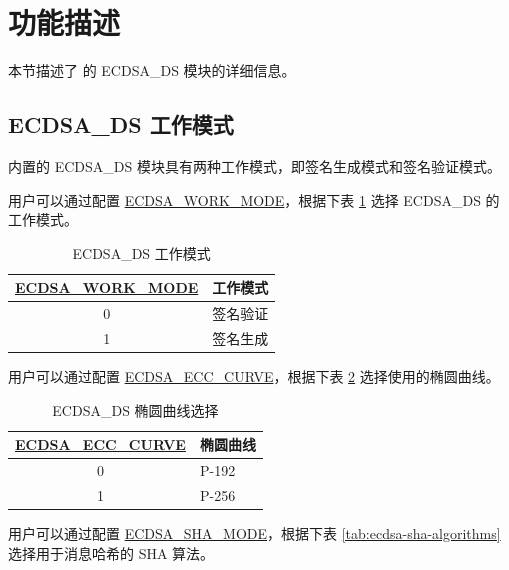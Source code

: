 \documentclass[main\_\_CN.tex]{subfiles}
\begin{document}
\section{功能描述}

本节描述了 \chipname{} 的 ECDSA\_DS 模块的详细信息。

\subsection{ECDSA\_DS 工作模式}

\chipname{} 内置的 ECDSA\_DS 模块具有两种工作模式，即签名生成模式和签名验证模式。

用户可以通过配置 \hyperref[fielddesc:ECDSAWORKMODE]{ECDSA\_WORK\_MODE}，根据下表 \ref{tab:ecdsa-working-mode} 选择 ECDSA\_DS 的工作模式。

\begin{table}[H]
    \centering
    \caption{ECDSA\_DS 工作模式}
    \label{tab:ecdsa-working-mode}
    \begin{tabular}{ | c | l | }
    \hline
        \rowcolor{lightgray}
        \textbf{\hyperref[fielddesc:ECDSAWORKMODE]{ECDSA\_WORK\_MODE}}      & \textbf{工作模式}\\\hline
        0                       & 签名验证  \\\hline
        1                       & 签名生成     \\\hline
    \end{tabular}
\end{table}

用户可以通过配置 \hyperref[fielddesc:ECDSAECCCURVE]{ECDSA\_ECC\_CURVE}，根据下表 \ref{tab:ecdsa-curve-selection} 选择使用的椭圆曲线。

\begin{table}[H]
    \centering
    \caption{ECDSA\_DS 椭圆曲线选择}
    \label{tab:ecdsa-curve-selection}
    \begin{tabular}{ | c | l | }
    \hline
        \rowcolor{lightgray}
        \textbf{\hyperref[fielddesc:ECDSAECCCURVE]{ECDSA\_ECC\_CURVE}}      & \textbf{椭圆曲线}\\
        \hline
        0                       & P-192    \\\hline
        1                       & P-256    \\\hline
    \end{tabular}
\end{table}

用户可以通过配置 \hyperref[fielddesc:ECDSASHAMODE]{ECDSA\_SHA\_MODE}，根据下表 \ref{tab:ecdsa-sha-algorithms} 选择用于消息哈希的 SHA 算法。
\end{document}
